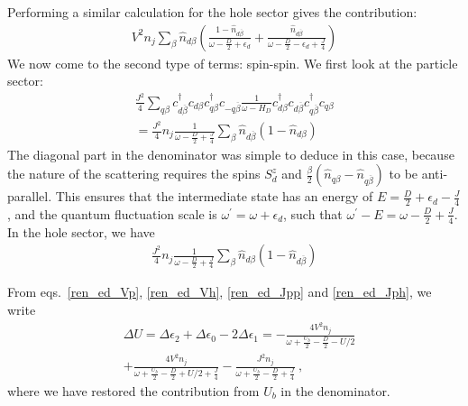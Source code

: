 \documentclass[reprint,superscriptaddress,floatfix]{revtex4-2}
\begin{document}
Performing a similar calculation for the hole sector gives the contribution:
\begin{equation}\begin{aligned}
	\label{ren_ed_Vh}
	V^2 n_j\sum_{\beta}\hat n_{d\beta}\left( \frac{1-\hat n_{d \overline\beta }}{\omega - \frac{D}{2} + \epsilon_d} + \frac{\hat n_{d \overline\beta}}{\omega - \frac{D}{2} - \epsilon_d + \frac{J}{4}}\right)
\end{aligned}\end{equation}
We now come to the second type of terms: spin-spin. We first look at the particle sector:
\begin{equation}\begin{aligned}
	\label{ren_ed_Jpp}
	\frac{J^2}{4}\sum_{q\beta}c^\dagger_{d\overline\beta}c_{d\beta}c^\dagger_{q\beta}c_{-q\overline\beta} \frac{1}{\omega - H_D}c^\dagger_{d\beta}c_{d\overline\beta}c^\dagger_{q\overline\beta}c_{q\beta}\\
	= \frac{J^2}{4} n_j\frac{1}{\omega - \frac{D}{2} + \frac{J}{4}} \sum_{\beta}\hat n_{d\overline\beta}\left( 1 - \hat n_{d\beta} \right)
\end{aligned}\end{equation}
The diagonal part in the denominator was simple to deduce in this case, because the nature of the scattering requires the spins \(S_d^z\) and \(\frac{\beta}{2}\left(\hat n_{q\beta} - \hat n_{q \overline\beta}\right)\) to be anti-parallel. This ensures that the intermediate state has an energy of \(E = \frac{D}{2} + \epsilon_d - \frac{J}{4}\), and the quantum fluctuation scale is \(\omega^\prime = \omega + \epsilon_d\), such that \(\omega^\prime - E = \omega - \frac{D}{2} + \frac{J}{4}\). In the hole sector, we have
\begin{equation}\begin{aligned}
	\label{ren_ed_Jph}
	\frac{J^2}{4} n_j\frac{1}{\omega - \frac{D}{2} + \frac{J}{4}} \sum_{\beta}\hat n_{d\beta}\left( 1 - \hat n_{d\overline\beta} \right)
\end{aligned}\end{equation}

From eqs.~\ref{ren_ed_Vp}, \ref{ren_ed_Vh}, \ref{ren_ed_Jpp} and \ref{ren_ed_Jph}, we write
\begin{equation}\begin{aligned}
	&\Delta U = \Delta \epsilon_2 + \Delta \epsilon_0 - 2\Delta \epsilon_1 = -\frac{4V^2 n_j}{\omega + \frac{U_b}{2} - \frac{D}{2} - U/2} \\
	&+ \frac{4V^2 n_j}{\omega + \frac{U_b}{2} - \frac{D}{2} + U/2 + \frac{J}{4}} - \frac{J^2n_j}{\omega + \frac{U_b}{2} - \frac{D}{2} + \frac{J}{4}}~,
\end{aligned}\end{equation}
where we have restored the contribution from \(U_b\) in the denominator.
\end{document}
